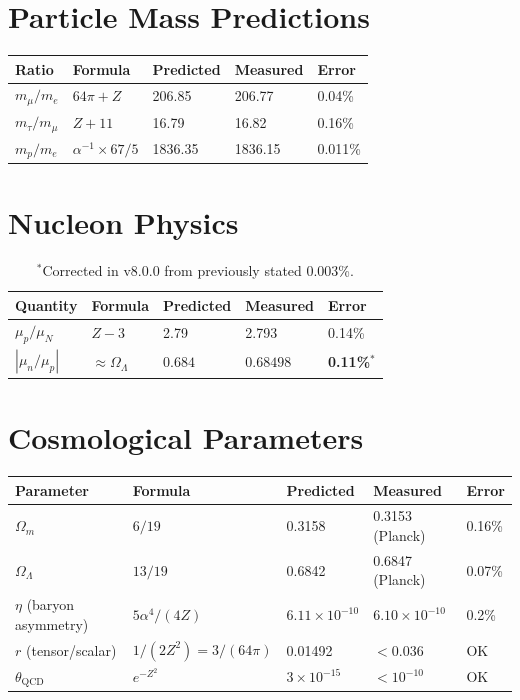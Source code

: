 \documentclass[11pt,a4paper]{article}
\theoremstyle{plain}
\theoremstyle{definition}
\theoremstyle{remark}
\newcommand{\Omegam}{\Omega_m}
\newcommand{\OmegaL}{\Omega_\Lambda}
\begin{document}
\section{Particle Mass Predictions}

\begin{table}[h!]
\centering
\begin{tabular}{lllll}
\toprule
\textbf{Ratio} & \textbf{Formula} & \textbf{Predicted} & \textbf{Measured} & \textbf{Error} \\
\midrule
$m_\mu/m_e$ & $64\pi + Z$ & 206.85 & 206.77 & 0.04\% \\
$m_\tau/m_\mu$ & $Z + 11$ & 16.79 & 16.82 & 0.16\% \\
$m_p/m_e$ & $\alpha^{-1} \times 67/5$ & 1836.35 & 1836.15 & 0.011\% \\
\bottomrule
\end{tabular}
\end{table}

\section{Nucleon Physics}

\begin{table}[h!]
\centering
\begin{tabular}{lllll}
\toprule
\textbf{Quantity} & \textbf{Formula} & \textbf{Predicted} & \textbf{Measured} & \textbf{Error} \\
\midrule
$\mu_p/\mu_N$ & $Z - 3$ & 2.79 & 2.793 & 0.14\% \\
$|\mu_n/\mu_p|$ & $\approx\OmegaL$ & $0.684$ & $0.68498$ & \textbf{0.11\%}$^*$ \\
\bottomrule
\end{tabular}
\caption{$^*$Corrected in v8.0.0 from previously stated 0.003\%.}
\end{table}

\section{Cosmological Parameters}

\begin{table}[h!]
\centering
\begin{tabular}{lllll}
\toprule
\textbf{Parameter} & \textbf{Formula} & \textbf{Predicted} & \textbf{Measured} & \textbf{Error} \\
\midrule
$\Omegam$ & $6/19$ & 0.3158 & 0.3153 (Planck) & 0.16\% \\
$\OmegaL$ & $13/19$ & 0.6842 & 0.6847 (Planck) & 0.07\% \\
$\eta$ (baryon asymmetry) & $5\alpha^4/(4Z)$ & $6.11 \times 10^{-10}$ & $6.10 \times 10^{-10}$ & 0.2\% \\
$r$ (tensor/scalar) & $1/(2Z^2) = 3/(64\pi)$ & 0.01492 & $<0.036$ & OK \\
$\theta_{\text{QCD}}$ & $e^{-Z^2}$ & $3 \times 10^{-15}$ & $<10^{-10}$ & OK \\
\bottomrule
\end{tabular}
\end{table}
\end{document}
